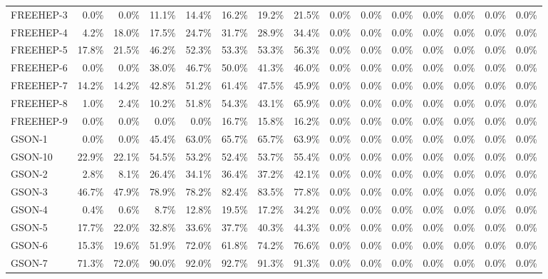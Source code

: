 \begin{tabular}{ l rrrrrrr rrrrrrr}
FREEHEP-3 &  0.0\% &  0.0\% &  11.1\% &  14.4\% &  16.2\% &  19.2\% &  21.5\% &  0.0\% &  0.0\% &  0.0\% &  0.0\% &  0.0\% &  0.0\% &  0.0\%\\ 
FREEHEP-4 &  4.2\% &  18.0\% &  17.5\% &  24.7\% &  31.7\% &  28.9\% &  34.4\% &  0.0\% &  0.0\% &  0.0\% &  0.0\% &  0.0\% &  0.0\% &  0.0\%\\ 
FREEHEP-5 &  17.8\% &  21.5\% &  46.2\% &  52.3\% &  53.3\% &  53.3\% &  56.3\% &  0.0\% &  0.0\% &  0.0\% &  0.0\% &  0.0\% &  0.0\% &  0.0\%\\ 
FREEHEP-6 &  0.0\% &  0.0\% &  38.0\% &  46.7\% &  50.0\% &  41.3\% &  46.0\% &  0.0\% &  0.0\% &  0.0\% &  0.0\% &  0.0\% &  0.0\% &  0.0\%\\ 
FREEHEP-7 &  14.2\% &  14.2\% &  42.8\% &  51.2\% &  61.4\% &  47.5\% &  45.9\% &  0.0\% &  0.0\% &  0.0\% &  0.0\% &  0.0\% &  0.0\% &  0.0\%\\ 
FREEHEP-8 &  1.0\% &  2.4\% &  10.2\% &  51.8\% &  54.3\% &  43.1\% &  65.9\% &  0.0\% &  0.0\% &  0.0\% &  0.0\% &  0.0\% &  0.0\% &  0.0\%\\ 
FREEHEP-9 &  0.0\% &  0.0\% &  0.0\% &  0.0\% &  16.7\% &  15.8\% &  16.2\% &  0.0\% &  0.0\% &  0.0\% &  0.0\% &  0.0\% &  0.0\% &  0.0\%\\ 
GSON-1 &  0.0\% &  0.0\% &  45.4\% &  63.0\% &  65.7\% &  65.7\% &  63.9\% &  0.0\% &  0.0\% &  0.0\% &  0.0\% &  0.0\% &  0.0\% &  0.0\%\\ 
GSON-10 &  22.9\% &  22.1\% &  54.5\% &  53.2\% &  52.4\% &  53.7\% &  55.4\% &  0.0\% &  0.0\% &  0.0\% &  0.0\% &  0.0\% &  0.0\% &  0.0\%\\ 
GSON-2 &  2.8\% &  8.1\% &  26.4\% &  34.1\% &  36.4\% &  37.2\% &  42.1\% &  0.0\% &  0.0\% &  0.0\% &  0.0\% &  0.0\% &  0.0\% &  0.0\%\\ 
GSON-3 &  46.7\% &  47.9\% &  78.9\% &  78.2\% &  82.4\% &  83.5\% &  77.8\% &  0.0\% &  0.0\% &  0.0\% &  0.0\% &  0.0\% &  0.0\% &  0.0\%\\ 
GSON-4 &  0.4\% &  0.6\% &  8.7\% &  12.8\% &  19.5\% &  17.2\% &  34.2\% &  0.0\% &  0.0\% &  0.0\% &  0.0\% &  0.0\% &  0.0\% &  0.0\%\\ 
GSON-5 &  17.7\% &  22.0\% &  32.8\% &  33.6\% &  37.7\% &  40.3\% &  44.3\% &  0.0\% &  0.0\% &  0.0\% &  0.0\% &  0.0\% &  0.0\% &  0.0\%\\ 
GSON-6 &  15.3\% &  19.6\% &  51.9\% &  72.0\% &  61.8\% &  74.2\% &  76.6\% &  0.0\% &  0.0\% &  0.0\% &  0.0\% &  0.0\% &  0.0\% &  0.0\%\\ 
GSON-7 &  71.3\% &  72.0\% &  90.0\% &  92.0\% &  92.7\% &  91.3\% &  91.3\% &  0.0\% &  0.0\% &  0.0\% &  0.0\% &  0.0\% &  0.0\% &  0.0\%\\ 

\end{tabular}
